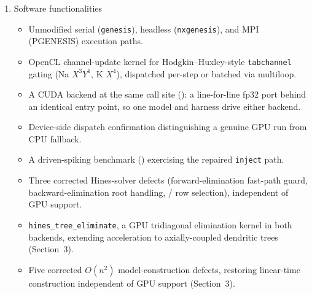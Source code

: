 \documentclass[preprint,12pt, a4paper]{elsarticle}
\newcommand{\hte}{\texttt{hines\_\allowbreak tree\_\allowbreak eliminate}}
\begin{document}
\begin{enumerate}
\begin{enumerate}
    Both dispatch modes update each compartment independently, exact only for single-compartment (isopotential) neurons: a real dendritic tree's compartments are coupled through axial resistance, solved on the CPU by \texttt{hsolve} as a compiled bytecode program performing a bottom-up/top-down Gaussian elimination over the tree's tridiagonal system once per step. We add a third kernel, \hte{} (; CUDA port in ), executing this identical bytecode on the GPU, one thread per disconnected tree (neuron), operating on the same flat opcode/coefficient arrays the CPU solver already builds at \texttt{SETUP} time. Because independent trees never reference each other's rows (the combined program is block-diagonal), threads need no synchronization. The channel and elimination kernels dispatch back to back on the same queue/stream, so the $K$-step batch still uploads and downloads state once. / select this path whenever the \texttt{hsolve} contains a multi-compartment tree, leaving the original kernel for single-compartment networks.

    \item Software functionalities

    \begin{itemize}
        \item Unmodified serial (\texttt{genesis}), headless (\texttt{nxgenesis}), and MPI (PGENESIS) execution paths.
        \item OpenCL channel-update kernel for Hodgkin--Huxley-style \texttt{tabchannel} gating (Na $X^3Y^1$, K $X^4$), dispatched per-step or batched via multiloop.
        \item A CUDA backend at the same call site (): a line-for-line fp32 port behind an identical entry point, so one model and harness drive either backend.
        \item Device-side dispatch confirmation distinguishing a genuine GPU run from CPU fallback.
        \item A driven-spiking benchmark () exercising the repaired \texttt{inject} path.
        \item Three corrected Hines-solver defects (forward-elimination fast-path guard, backward-elimination root handling, / row selection), independent of GPU support.
        \item \hte{}, a GPU tridiagonal elimination kernel in both backends, extending acceleration to axially-coupled dendritic trees (Section~3).
        \item Five corrected $O(n^2)$ model-construction defects, restoring linear-time construction independent of GPU support (Section~3).
    \end{itemize}
\end{enumerate}


\end{enumerate}
\end{document}
